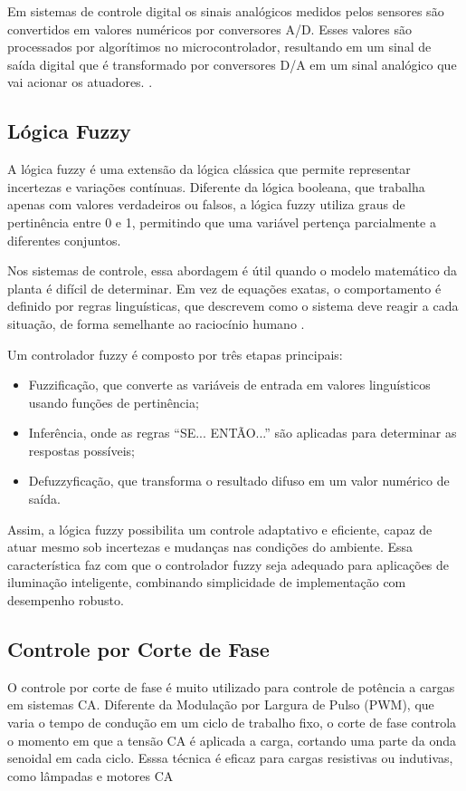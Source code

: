 Em sistemas de controle digital os sinais analógicos medidos pelos sensores são convertidos em valores numéricos por conversores A/D. Esses valores são processados por algorítimos no microcontrolador, resultando em um sinal de saída digital que é transformado por conversores D/A em um sinal analógico que vai acionar os atuadores. \cite{Ogata2010}.

\subsection{Lógica Fuzzy}
A lógica fuzzy é uma extensão da lógica clássica que permite representar incertezas e variações contínuas. Diferente da lógica booleana, que trabalha apenas com valores verdadeiros ou falsos, a lógica fuzzy utiliza graus de pertinência entre 0 e 1, permitindo que uma variável pertença parcialmente a diferentes conjuntos.

Nos sistemas de controle, essa abordagem é útil quando o modelo matemático da planta é difícil de determinar. Em vez de equações exatas, o comportamento é definido por regras linguísticas, que descrevem como o sistema deve reagir a cada situação, de forma semelhante ao raciocínio humano \cite{Habib-Doutorado}.

Um controlador fuzzy é composto por três etapas principais:
\begin{itemize}
    \item Fuzzificação, que converte as variáveis de entrada em valores linguísticos usando funções de pertinência;
    \item Inferência, onde as regras “SE... ENTÃO...” são aplicadas para determinar as respostas possíveis;
    \item Defuzzyficação, que transforma o resultado difuso em um valor numérico de saída.
\end{itemize}

Assim, a lógica fuzzy possibilita um controle adaptativo e eficiente, capaz de atuar mesmo sob incertezas e mudanças nas condições do ambiente. Essa característica faz com que o controlador fuzzy seja adequado para aplicações de iluminação inteligente, combinando simplicidade de implementação com desempenho robusto.


\subsection{Controle por Corte de Fase}
O controle por corte de fase é muito utilizado para controle de potência a cargas em sistemas \gls{CA}. Diferente da Modulação por Largura de Pulso (\gls{PWM}), que varia o tempo de condução em um ciclo de trabalho fixo, o corte de fase controla o momento em que a tensão \gls{CA} é aplicada a carga, cortando uma parte da onda senoidal em cada ciclo. Esssa técnica é eficaz para cargas resistivas ou indutivas, como lâmpadas e motores \gls{CA}

